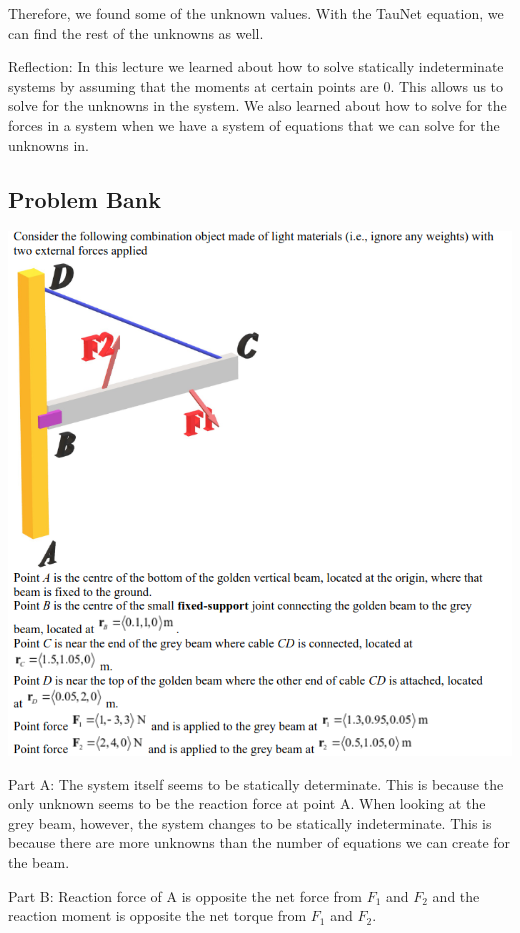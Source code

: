 \documentclass{article}[14pt, letterpaper, Times New Roman]
\begin{document}
Therefore, we found some of the unknown values. 
With the TauNet equation, we can find the rest of the unknowns as well.

\medskip

Reflection: In this lecture we learned about how to solve statically indeterminate systems by assuming that the moments at certain points are 0.
This allows us to solve for the unknowns in the system.
We also learned about how to solve for the forces in a system when we have a system of equations that we can solve for the unknowns in.

\subsection{Problem Bank}

\includegraphics[width=15cm]{l6-pbq.png}

Part A: The system itself seems to be statically determinate.
This is because the only unknown seems to be the reaction force at point A.
When looking at the grey beam, however, the system changes to be statically indeterminate.
This is because there are more unknowns than the number of equations we can create for the beam.

Part B: Reaction force of A is opposite the net force from $F_1$ and $F_2$ and the reaction moment is opposite the net torque from $F_1$ and $F_2$.
\end{document}
